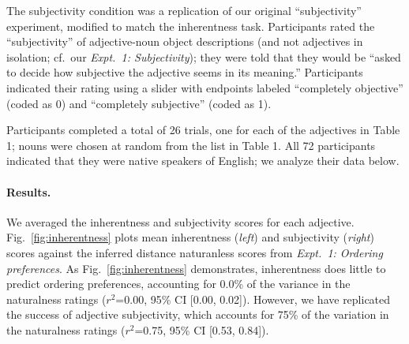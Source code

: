 \documentclass[12pt]{article}
\begin{document}
The subjectivity condition was a replication of our original ``subjectivity'' experiment, modified to match the inherentness task. Participants rated the ``subjectivity'' of adjective-noun object descriptions (and not adjectives in isolation; cf.~our \emph{Expt.~1: Subjectivity}); they were told that they would be ``asked to decide how subjective the adjective seems in its meaning.'' Participants indicated their rating using a slider with endpoints labeled ``completely objective'' (coded as 0) and ``completely subjective'' (coded as 1).

Participants completed a total of 26 trials, one for each of the adjectives in Table 1; nouns were chosen at random from the list in Table 1. All 72 participants indicated that they were native speakers of English; we analyze their data below.

\paragraph{Results.} We averaged the inherentness and subjectivity scores for each adjective. Fig.~\ref{fig:inherentness} plots mean inherentness (\emph{left}) and subjectivity (\emph{right}) scores against the inferred distance naturanless scores from \textit{Expt.~1: Ordering preferences}. As Fig.~\ref{fig:inherentness} demonstrates, inherentness does little to predict ordering preferences, accounting for 0.0\% of the variance in the naturalness ratings ($r^2${=}0.00, 95\% CI [0.00,  0.02]). However, we have replicated the success of adjective subjectivity, which accounts for 75\% of the variation in the naturalness ratings ($r^2${=}0.75, 95\% CI [0.53,  0.84]).
\end{document}
